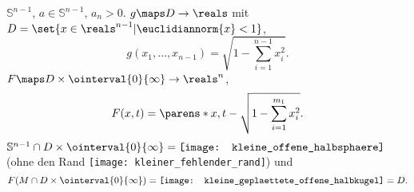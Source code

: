 \begin{beispiel*}
  \( \mathbb{S}^{n-1} \), \( a\in \mathbb{S}^{n-1} \), \( a_n>0 \). \( g\maps D\to \reals  \) mit \( D=\set{x\in \reals^{n-1}|\euclidiannorm{x}<1} \),
  \begin{equation*}
    g(x_1,\dotsc,x_{n-1})=\sqrt{1-\sum_{i=1}^{n-1}x_i^2}.
  \end{equation*}
  \( F\maps D\times \ointerval{0}{\infty}\to \reals^n \),
  \begin{equation*}
    F(x,t)=\parens*{x,t-\sqrt{1-\sum_{i=1}^{m_1}x_i^2}}.
  \end{equation*}
  \( \mathbb{S}^{n-1}\cap D\times \ointerval{0}{\infty}=\texttt{[image: kleine\_offene\_halbsphaere]} \) (ohne den Rand \texttt{[image: kleiner\_fehlender\_rand]}) und %
  \begin{equation*}
    F(M\cap D\times \ointerval{0}{\infty})=\texttt{[image: kleine\_geplaettete\_offene\_halbkugel]}=D. %
  \end{equation*}
\end{beispiel*}
